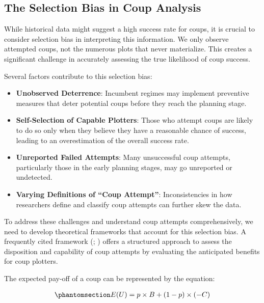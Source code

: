 \documentclass[
  12pt,
]{report}
\begin{document}
\subsection{The Selection Bias in Coup
Analysis}\label{the-selection-bias-in-coup-analysis}

While historical data might suggest a high success rate for coups, it is
crucial to consider selection bias in interpreting this information. We
only observe attempted coups, not the numerous plots that never
materialize. This creates a significant challenge in accurately
assessing the true likelihood of coup success.

Several factors contribute to this selection bias:

\begin{itemize}
\item
  \textbf{Unobserved Deterrence}: Incumbent regimes may implement
  preventive measures that deter potential coups before they reach the
  planning stage.
\item
  \textbf{Self-Selection of Capable Plotters}: Those who attempt coups
  are likely to do so only when they believe they have a reasonable
  chance of success, leading to an overestimation of the overall success
  rate.
\item
  \textbf{Unreported Failed Attempts}: Many unsuccessful coup attempts,
  particularly those in the early planning stages, may go unreported or
  undetected.
\item
  \textbf{Varying Definitions of ``Coup Attempt''}: Inconsistencies in
  how researchers define and classify coup attempts can further skew the
  data.
\end{itemize}

To address these challenges and understand coup attempts
comprehensively, we need to develop theoretical frameworks that account
for this selection bias. A frequently cited framework
(;
) offers a structured
approach to assess the disposition and capability of coup attempts by
evaluating the anticipated benefits for coup plotters.

The expected pay-off of a coup can be represented by the equation:

\begin{equation}\phantomsection\label{eq-eq1}{
\begin{aligned}
E(U) = p \times B + (1 - p) \times (-C)
\end{aligned}
}\end{equation}
\end{document}
